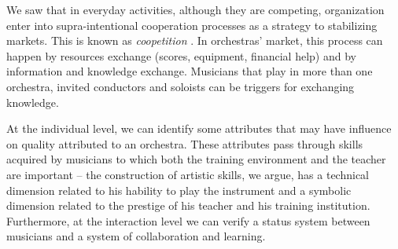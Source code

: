 \documentclass[a4paper, 12pt, openright, oneside, german, french, brazil, english]{abntex2}
\begin{document}
	We saw that in everyday activities, although they are competing, organization enter into supra-intentional cooperation processes as a strategy to stabilizing markets. This is known as \textit{coopetition} \cite{lazega2009theorie}. In orchestras' market, this process can happen by resources exchange (scores, equipment, financial help) and by information and knowledge exchange. Musicians that play in more than one orchestra, invited conductors and soloists can be triggers for exchanging knowledge.
	
	
	At the individual level, we can identify some attributes that may have influence on quality attributed to an orchestra. These attributes pass through skills acquired by musicians to which both the training environment and the teacher are important -- the construction of artistic skills, we argue, has a technical dimension related to his hability to play the instrument and a symbolic dimension related to the prestige of his teacher and his training institution. Furthermore, at the interaction level we can verify a status system between musicians and a system of collaboration and learning.
	
	
\end{document}
